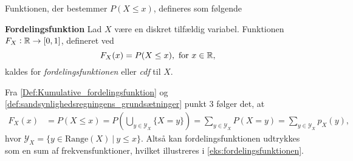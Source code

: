 





Funktionen, der bestemmer $P(X \leq x)$, defineres som følgende


\begin{minipage}\textwidth
\begin{defn}\textbf{Fordelingsfunktion}\label{Def:Kumulative_fordelingsfunktion} %
\newline
Lad $X$ være en diskret tilfældig variabel. Funktionen $F_X:\mathbb{R} \to [0,1]$, defineret ved
$$F_X(x)=P(X\leq x), \text{ for } x\in\mathbb{R},$$
kaldes for \textit{fordelingsfunktionen} eller \textit{cdf} til $X$.
\end{defn}
\end{minipage}

Fra \autoref{Def:Kumulative_fordelingsfunktion} og \autoref{def:sandsynlighedsregningens_grundsætninger} punkt 3 følger det, at
%
\begin{align}
    F_X(x) &= P\left(X\leq x\right)=P\left(\bigcup_{y\in \mathcal{Y}_X} \{X=y\}\right) = \sum_{y\in \mathcal{Y}_X} P(X=y) = \sum_{y\in \mathcal{Y}_X} p_X(y), \label{eq:fordelingsfunktion_som_sum_af_frekvensfunktioner}
\end{align}
hvor $\mathcal{Y}_X = \{y\in \text{Range}(X) \ | \ y\leq x\}$.
%
Altså kan fordelingsfunktionen udtrykkes som en sum af frekvensfunktioner, hvilket illustreres i \autoref{eks:fordelingsfunktionen}.


